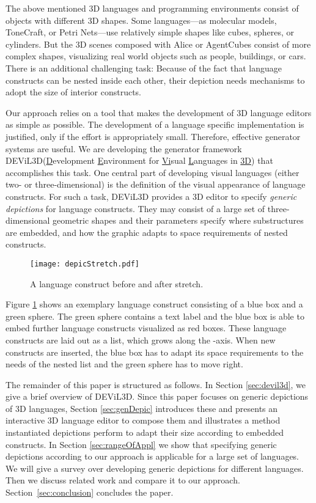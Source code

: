 \documentclass[a4paper]{article}
\newcommand{\dev}{DEViL3D\xspace}
\begin{document}
The above mentioned 3D languages and programming environments consist of objects with different 3D shapes. Some languages---as molecular models, ToneCraft, or Petri Nets---use relatively simple shapes like cubes, spheres, or cylinders. But the 3D scenes composed with Alice or AgentCubes consist of more complex shapes, visualizing real world objects such as people, buildings, or cars. There is an additional challenging task: Because of the fact that language constructs can be nested inside each other, their depiction needs mechanisms to adopt the size of interior constructs.

Our approach relies on a tool that makes the development of 3D language editors as simple as possible. The development of a language specific implementation is justified, only if the effort is appropriately small. Therefore, effective generator systems are useful. We are developing the generator framework \dev (\underline{D}evelopment \underline{E}nvironment for \underline{Vi}sual \underline{L}anguages in \underline{3D}) that accomplishes this task. One central part of developing visual languages (either two- or three-dimensional) is the definition of the visual appearance of language constructs. For such a task, \dev provides a 3D editor to specify \emph{generic depictions} for language constructs. They may consist of a large set of three-dimensional geometric shapes and their parameters specify where substructures are embedded, and how the graphic adapts to space requirements of nested constructs.

\begin{figure}[!ht]
  \centering
  \texttt{[image: depicStretch.pdf]}
  \caption{A language construct before and after stretch.}
  \label{fig:depicStretch}
\end{figure}

Figure \ref{fig:depicStretch} shows an exemplary language construct consisting of a blue box and a green sphere. The green sphere contains a text label and the blue box is able to embed further language constructs visualized as red boxes. These language constructs are laid out as a list, which grows along the -axis. When new constructs are inserted, the blue box has to adapt its space requirements to the needs of the nested list and the green sphere has to move right.


The remainder of this paper is structured as follows. In Section \ref{sec:devil3d}, we give a brief overview of \dev. Since this paper focuses on generic depictions of 3D languages, Section \ref{sec:genDepic} introduces these and presents an interactive 3D language editor to compose them and illustrates a method instantiated depictions perform to adapt their size according to embedded constructs. In Section \ref{sec:rangeOfAppl} we show that specifying generic depictions according to our approach is applicable for a large set of languages. We will give a survey over developing generic depictions for different languages. Then we discuss related work and compare it to our approach. Section~\ref{sec:conclusion} concludes the paper.
\end{document}

